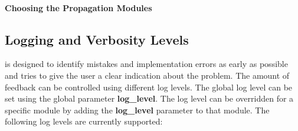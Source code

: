 
\paragraph{Choosing the Propagation Modules}
\wip

\subsection{Logging and Verbosity Levels}
\label{sec:logging_verbosity}
\apsq is designed to identify mistakes and implementation errors as early as possible and tries to give the user a clear indication about the problem. The amount of feedback can be controlled using different log levels. The global log level can be set using the global parameter \textbf{log\_level}. The log level can be overridden for a specific module by adding the \textbf{log\_level} parameter to that module. The following log levels are currently supported:

